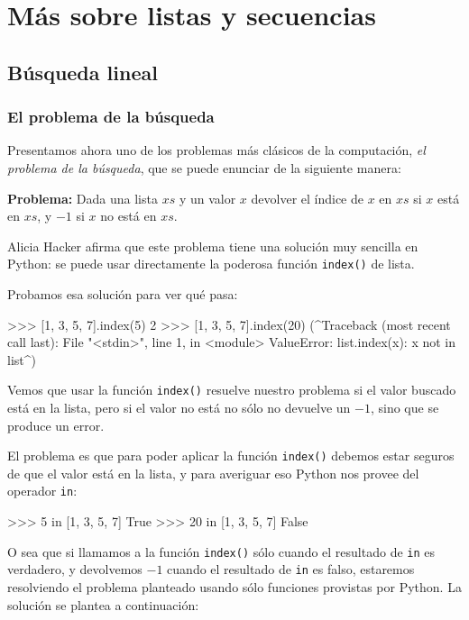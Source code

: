 \chapter[Más sobre listas]{Más sobre listas y secuencias}

\section{Búsqueda lineal}

\subsection*{El problema de la búsqueda}

Presentamos ahora uno de los problemas más clásicos de la computación, \emph{el
problema de la búsqueda}, que se puede enunciar de la siguiente manera:

{\bf Problema: } Dada una lista $xs$ y un valor $x$ devolver el índice de $x$
en $xs$ si $x$ está en $xs$, y $-1$ si $x$ no está en $xs$.

Alicia Hacker afirma que este problema tiene una solución muy sencilla en
Python: se puede usar directamente la poderosa función \lstinline+index()+ de
lista.

Probamos esa solución para ver qué pasa:

\begin{codigo-python-sn}
>>> [1, 3, 5, 7].index(5)
2
>>> [1, 3, 5, 7].index(20)
(^Traceback (most recent call last):
  File "<stdin>", line 1, in <module>
ValueError: list.index(x): x not in list^)
\end{codigo-python-sn}

Vemos que usar la función \lstinline+index()+ resuelve nuestro problema si el
valor buscado está en la lista, pero si el valor no está no sólo no devuelve
un $-1$, sino que se produce un error.

El problema es que para poder aplicar la función \lstinline+index()+ debemos
estar seguros de que el valor está en la lista, y para averiguar eso Python
nos provee del operador \lstinline+in+:

\begin{codigo-python-sn}
>>> 5 in [1, 3, 5, 7]
True
>>> 20 in [1, 3, 5, 7]
False
\end{codigo-python-sn}

O sea que si llamamos a la función \lstinline+index()+ sólo cuando el
resultado de \lstinline+in+ es verdadero, y devolvemos $-1$ cuando el
resultado de \lstinline+in+ es falso, estaremos resolviendo el problema
planteado usando sólo funciones provistas por Python. La solución se plantea a
continuación:

